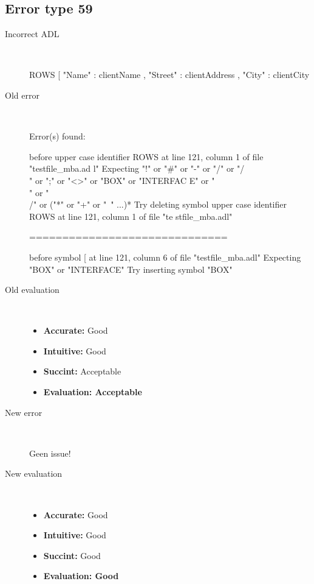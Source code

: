 \hrulefill

\subsection{Error type 59}
  \begin{description}
  \item[Incorrect ADL]~\\
\begin{adl}
ROWS [ "Name"   : clientName
    , "Street" : clientAddress
    , "City"   : clientCity\end{adl}
  \item[Old error]~\\
\begin{haskell}
Error(s) found:

before upper case identifier ROWS at line 121, column 1 of file "testfile_mba.ad
l"
Expecting "!" or "#" or "-" or "/" or "/\\" or ";" or "<>" or "BOX" or "INTERFAC
E" or "\\" or "\\/" or ("*" or "+" or "~" ...)*
Try deleting symbol upper case identifier ROWS at line 121, column 1 of file "te
stfile_mba.adl"

==============================

before symbol [ at line 121, column 6 of file "testfile_mba.adl"
Expecting "BOX" or "INTERFACE"
Try inserting symbol "BOX"

\end{haskell}
  \item[Old evaluation]~\\
    \begin{itemize}
    \item \textbf{Accurate:} Good
    \item \textbf{Intuitive:} Good
    \item \textbf{Succint:} Acceptable
    \item \textbf{Evaluation: Acceptable}
    \end{itemize}
  \item[New error]~\\
\begin{haskell}
Geen issue!\end{haskell}
  \item[New evaluation]~\\
    \begin{itemize}
    \item \textbf{Accurate:} Good
    \item \textbf{Intuitive:} Good
    \item \textbf{Succint:} Good
    \item \textbf{Evaluation: Good
}
    \end{itemize}
  \end{description}


